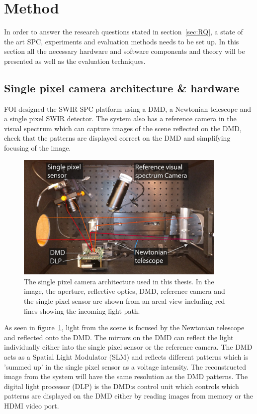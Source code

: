 \section{Method}
\label{sec:method}
In order to answer the research questions stated in section~\ref{sec:RQ}, a state of the art SPC, experiments and evaluation methods needs to be set up. In this section all the necessary hardware and software components and theory will be presented as well as the evaluation techniques. 


\subsection{Single pixel camera architecture \& hardware}
\label{sec:system}
FOI designed the SWIR SPC platform using a DMD, a Newtonian telescope and a single pixel SWIR detector. The system also has a reference camera in the visual spectrum  which can capture images of the scene reflected on the DMD, check that the patterns are displayed correct on the DMD and simplifying focusing of the image.  

\begin{figure}[H]
    \centering
    \includegraphics[width = 0.9\textwidth]{gfx/SPC.png}
    \caption{The single pixel camera architecture used in this thesis. In the image, the aperture, reflective optics, DMD, reference camera and the single pixel sensor are shown from an areal view including red lines showing the incoming light path.}
    \label{fig:system1}
\end{figure}



As seen in figure~\ref{fig:system1}, light from the scene is focused by the Newtonian telescope and reflected onto the DMD. The mirrors on the DMD can reflect the light individually either into the single pixel sensor or the reference camera. The DMD acts as a Spatial Light Modulator (SLM) and reflects different patterns which is 'summed up' in the single pixel sensor as a voltage intensity. The reconstructed image from the system will have the same resolution as the DMD patterns. The digital light processor (DLP) is the DMD:s control unit which controls which patterns are displayed on the DMD either by reading images from memory or the HDMI video port. 

